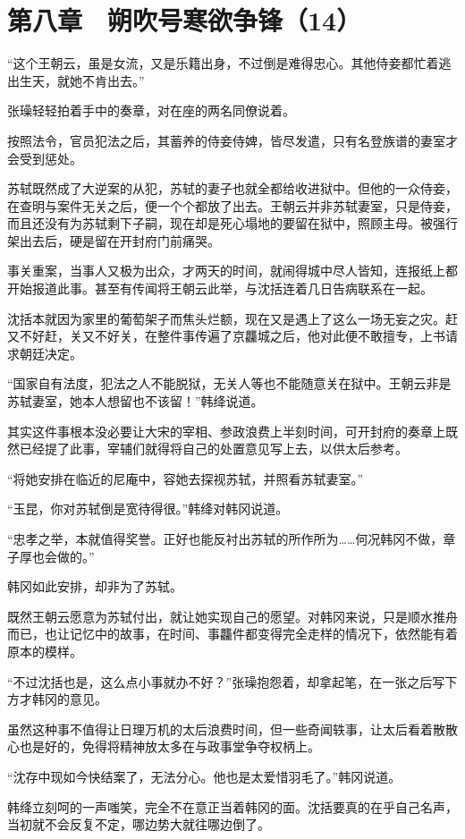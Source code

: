 \section{第八章　朔吹号寒欲争锋（14）}

“这个王朝云，虽是女流，又是乐籍出身，不过倒是难得忠心。其他侍妾都忙着逃出生天，就她不肯出去。”

张璪轻轻拍着手中的奏章，对在座的两名同僚说着。

按照法令，官员犯法之后，其蓄养的侍妾侍婢，皆尽发遣，只有名登族谱的妻室才会受到惩处。

苏轼既然成了大逆案的从犯，苏轼的妻子也就全都给收进狱中。但他的一众侍妾，在查明与案件无关之后，便一个个都放了出去。王朝云并非苏轼妻室，只是侍妾，而且还没有为苏轼剩下子嗣，现在却是死心塌地的要留在狱中，照顾主母。被强行架出去后，硬是留在开封府门前痛哭。

事关重案，当事人又极为出众，才两天的时间，就闹得城中尽人皆知，连报纸上都开始报道此事。甚至有传闻将王朝云此举，与沈括连着几日告病联系在一起。

沈括本就因为家里的葡萄架子而焦头烂额，现在又是遇上了这么一场无妄之灾。赶又不好赶，关又不好关，在整件事传遍了京龘城之后，他对此便不敢擅专，上书请求朝廷决定。

“国家自有法度，犯法之人不能脱狱，无关人等也不能随意关在狱中。王朝云非是苏轼妻室，她本人想留也不该留！”韩绛说道。

其实这件事根本没必要让大宋的宰相、参政浪费上半刻时间，可开封府的奏章上既然已经提了此事，宰辅们就得将自己的处置意见写上去，以供太后参考。

“将她安排在临近的尼庵中，容她去探视苏轼，并照看苏轼妻室。”

“玉昆，你对苏轼倒是宽待得很。”韩绛对韩冈说道。

“忠孝之举，本就值得奖誉。正好也能反衬出苏轼的所作所为……何况韩冈不做，章子厚也会做的。”

韩冈如此安排，却非为了苏轼。

既然王朝云愿意为苏轼付出，就让她实现自己的愿望。对韩冈来说，只是顺水推舟而已，也让记忆中的故事，在时间、事龘件都变得完全走样的情况下，依然能有着原本的模样。

“不过沈括也是，这么点小事就办不好？”张璪抱怨着，却拿起笔，在一张之后写下方才韩冈的意见。

虽然这种事不值得让日理万机的太后浪费时间，但一些奇闻轶事，让太后看着散散心也是好的，免得将精神放太多在与政事堂争夺权柄上。

“沈存中现如今快结案了，无法分心。他也是太爱惜羽毛了。”韩冈说道。

韩绛立刻呵的一声嗤笑，完全不在意正当着韩冈的面。沈括要真的在乎自己名声，当初就不会反复不定，哪边势大就往哪边倒了。

